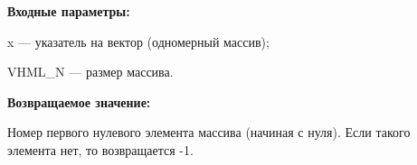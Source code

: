 \textbf{Входные параметры:}

 x --- указатель на вектор (одномерный массив);
 
 VHML\_N --- размер массива.

\textbf{Возвращаемое значение:}

 Номер первого нулевого элемента массива (начиная с нуля). Если такого элемента нет, то возвращается -1.